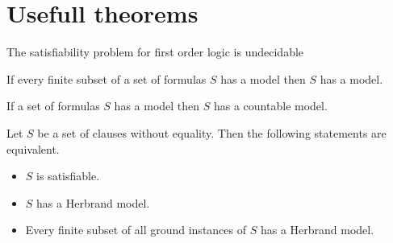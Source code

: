 
\section{Usefull theorems}

\begin{theorem}
The satisfiability problem for first order logic is undecidable
\end{theorem}

\begin{theorem}[Compactness]\label{the:compactness}
	If every finite subset of a set of formulas $S$ has a model then $S$ has a model. 
\end{theorem}

\begin{theorem}\label{the:loewenheim}
	If a set of formulas $S$ has a model then $S$ has a countable model.
\end{theorem}

\begin{theorem}[Herbrand]\label{the:herbrand}
	Let $S$ be a set of clauses without equality. Then the following statements are equivalent.
	\begin{itemize}
		\item $S$ is satisfiable.
		\item $S$ has a Herbrand model.
		\item Every finite subset of all ground instances of $S$ has a Herbrand model.
	\end{itemize} 
\end{theorem}

